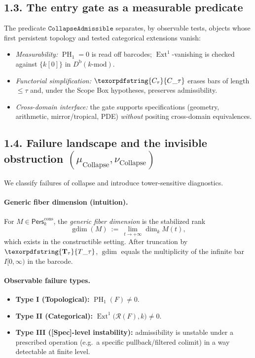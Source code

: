 \documentclass[11pt]{article}
\numberwithin{equation}{section}
\theoremstyle{plain}
\theoremstyle{definition}
\theoremstyle{remark}
\DeclareMathOperator{\Ext}{Ext}
\DeclareMathOperator{\PH}{PH}
\DeclareMathOperator{\gdim}{gdim}
\newcommand{\Pers}{\mathsf{Pers}}
\theoremstyle{plain}
\theoremstyle{definition}
\numberwithin{equation}{section}
\theoremstyle{definition}
\DeclareRobustCommand{\Ttau}{\texorpdfstring{\ensuremath{\mathbf{T}_{\tau}}}{T\_\tau}}
\DeclareRobustCommand{\Ctau}{\texorpdfstring{\ensuremath{C_{\tau}}}{C\_\tau}}
\numberwithin{equation}{section}
\theoremstyle{plain}
\theoremstyle{definition}
\theoremstyle{remark}
\newcommand{\Dbk}{D^{\mathrm{b}}(k\text{-mod})}
\newcommand{\Perscons}{\Pers^{\mathrm{cons}}_k}
\providecommand{\Cfun}[1]{\mathsf{C}_{#1}}
\providecommand{\Tfun}[1]{\mathbf{T}_{#1}}
\providecommand{\Ctau}{\Cfun{\tau}}
\providecommand{\Ttau}{\Tfun{\tau}}
\begin{document}
\subsection*{1.3. The entry gate as a measurable predicate}
The predicate \(\texttt{CollapseAdmissible}\) separates, by observable tests, objects whose first persistent topology and tested categorical extensions vanish:
\begin{itemize}[leftmargin=1.25em]
  \item \emph{Measurability:} \(\PH_1{=}0\) is read off barcodes; \(\Ext^1\)-vanishing is checked against \(\{k[0]\}\) in \(\Dbk\).
  \item \emph{Functorial simplification:} \(\Ctau\) erases bars of length \(\le \tau\) and, under the Scope Box hypotheses, preserves admissibility.
  \item \emph{Cross-domain interface:} the gate supports specifications (geometry, arithmetic, mirror/tropical, PDE) \emph{without} positing cross-domain equivalences.
\end{itemize}

\subsection*{1.4. Failure landscape and the invisible obstruction \texorpdfstring{\((\mu_{\mathrm{Collapse}},\nu_{\mathrm{Collapse}})\)}{(mu, nu)}}\label{sec:typeIV}
We classify failures of collapse and introduce tower-sensitive diagnostics.

\paragraph{Generic fiber dimension (intuition).}
For \(M\in\Perscons\), the \emph{generic fiber dimension} is the stabilized rank
\[
\gdim(M)\ :=\ \lim_{t\to+\infty}\dim_k M(t),
\]
which exists in the constructible setting. After truncation by \(\Ttau\), \(\gdim\) equals the multiplicity of the infinite bar \(I[0,\infty)\) in the barcode.

\paragraph{Observable failure types.}
\begin{itemize}[leftmargin=1.25em]
  \item \textbf{Type I (Topological):} \(\PH_1(F)\neq 0\).
  \item \textbf{Type II (Categorical):} \(\Ext^1\!\big(\mathcal{R}(F),k\big)\neq 0\).
  \item \textbf{Type III ([Spec]-level instability):} admissibility is unstable under a prescribed operation (e.g.\ a specific pullback/filtered colimit) in a way detectable at finite level.
\end{itemize}
\end{document}
